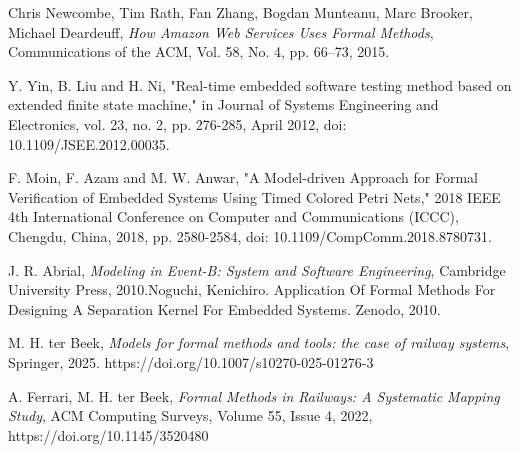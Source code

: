 \documentclass[conference]{IEEEtran}
\begin{document}
\begin{thebibliography}{00}
            Chris Newcombe, Tim Rath, Fan Zhang, Bogdan Munteanu, Marc Brooker, Michael Deardeuff, \emph{How Amazon Web Services Uses Formal Methods}, Communications of the ACM, Vol. 58, No. 4, pp. 66--73, 2015.
            
            Y. Yin, B. Liu and H. Ni, "Real-time embedded software testing method based on extended finite state machine," in Journal of Systems Engineering and Electronics, vol. 23, no. 2, pp. 276-285, April 2012, doi: 10.1109/JSEE.2012.00035.
            
            F. Moin, F. Azam and M. W. Anwar, "A Model-driven Approach for Formal Verification of Embedded Systems Using Timed Colored Petri Nets," 2018 IEEE 4th International Conference on Computer and Communications (ICCC), Chengdu, China, 2018, pp. 2580-2584, doi: 10.1109/CompComm.2018.8780731.
        
            J. R. Abrial, \emph{Modeling in Event-B: System and Software Engineering}, Cambridge University Press, 2010.Noguchi, Kenichiro. Application Of Formal Methods For Designing A Separation Kernel For Embedded Systems. Zenodo, 2010.
            
            M. H. ter Beek, \emph{Models for formal methods and tools: the case of railway systems}, Springer, 2025.
            https://doi.org/10.1007/s10270-025-01276-3
        
            A. Ferrari, M. H. ter Beek, \emph{Formal Methods in Railways: A Systematic Mapping Study}, ACM Computing Surveys, Volume 55, Issue 4, 2022, https://doi.org/10.1145/3520480
        \end{thebibliography}
\end{document}
